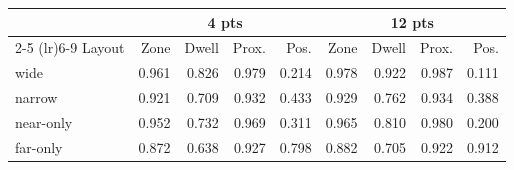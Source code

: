\begin{tabular}{lrrrrrrrr}
\toprule
 & \multicolumn{4}{c}{4 pts} & \multicolumn{4}{c}{12 pts} \\
\cmidrule(lr){2-5} \cmidrule(lr){6-9}
Layout & Zone & Dwell & Prox. & Pos. & Zone & Dwell & Prox. & Pos. \\
\midrule
wide & 0.961 & 0.826 & 0.979 & 0.214 & 0.978 & 0.922 & 0.987 & 0.111 \\
narrow & 0.921 & 0.709 & 0.932 & 0.433 & 0.929 & 0.762 & 0.934 & 0.388 \\
near-only & 0.952 & 0.732 & 0.969 & 0.311 & 0.965 & 0.810 & 0.980 & 0.200 \\
far-only & 0.872 & 0.638 & 0.927 & 0.798 & 0.882 & 0.705 & 0.922 & 0.912 \\
\bottomrule
\end{tabular}
